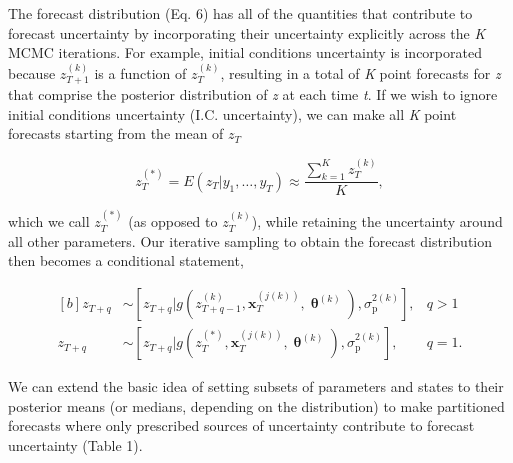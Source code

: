 \documentclass[12pt,]{article}
\begin{document}
The forecast distribution (Eq. 6) has all of the quantities that
contribute to forecast uncertainty by incorporating their uncertainty
explicitly across the \emph{K} MCMC iterations. For example, initial
conditions uncertainty is incorporated because \(z_{T+1}^{(k)}\) is a
function of \(z_{T}^{(k)}\), resulting in a total of \emph{K} point
forecasts for \emph{z} that comprise the posterior distribution of
\emph{z} at each time \emph{t}. If we wish to ignore initial conditions
uncertainty (I.C. uncertainty), we can make all \emph{K} point forecasts
starting from the mean of \(z_{T}\)

\begin{equation}
z_{T}^{(*)} = E(z_{T} | y_1,\dots,y_T) \approx \frac{\sum^K_{k=1} z_{T}^{(k)}}{K},
\end{equation}

\noindent{}which we call \(z^{(*)}_T\) (as opposed to \(z^{(k)}_T\)),
while retaining the uncertainty around all other parameters. Our
iterative sampling to obtain the forecast distribution then becomes a
conditional statement,

\begin{equation}
\begin{aligned}[b]
z_{T+q} &\sim \left[z_{T+q} | g(z_{T+q-1}^{(k)}, \textbf{x}_T^{(j(k))}, \bm{\uptheta}^{(k)}), \sigma^{2(k)}_{\text{p}} \right], &q>1 \\
z_{T+q} &\sim \left[z_{T+q} | g(z_{T}^{(*)}, \textbf{x}_T^{(j(k))}, \bm{\uptheta}^{(k)}), \sigma^{2(k)}_{\text{p}} \right], &q=1.
\end{aligned}
\end{equation}

\noindent{}We can extend the basic idea of setting subsets of parameters
and states to their posterior means (or medians, depending on the
distribution) to make partitioned forecasts where only prescribed
sources of uncertainty contribute to forecast uncertainty (Table 1).
\end{document}
